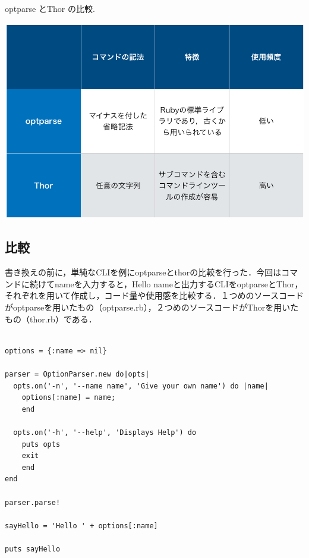 \begin{table}[H]
\centering
\begin{center}
\caption{optparse とThor の比較. \label{opt_thor}}
\includegraphics[width=150mm]{../.././figs/opt_thor.png}
\end{center}


\label{fig:This}
\end{table}

\subsection{比較}\label{}

書き換えの前に，単純なCLIを例にoptparseとthorの比較を行った．今回はコマンドに続けてnameを入力すると，Hello nameと出力するCLIをoptparseとThor，それぞれを用いて作成し，コード量や使用感を比較する．１つめのソースコードがoptparseを用いたもの（optparse.rb），２つめのソースコードがThorを用いたもの（thor.rb）である．

\begin{screen}
{\small
\begin{verbatim}

options = {:name => nil}

parser = OptionParser.new do|opts|
  opts.on('-n', '--name name', 'Give your own name') do |name|
    options[:name] = name;
    end

  opts.on('-h', '--help', 'Displays Help') do
    puts opts
    exit
    end
end

parser.parse!

sayHello = 'Hello ' + options[:name]

puts sayHello

\end{verbatim}}
\end{screen}


